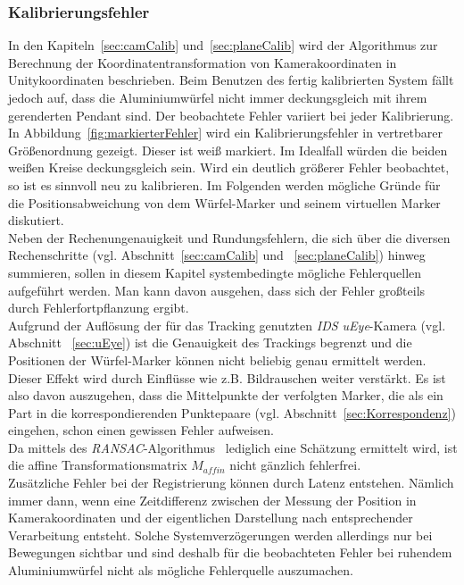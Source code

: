 \subsubsection{Kalibrierungsfehler} \label{sec:calibError}
In den Kapiteln~\ref{sec:camCalib} und~\ref{sec:planeCalib} wird der Algorithmus zur Berechnung der Koordinatentransformation von Kamerakoordinaten in Unitykoordinaten beschrieben. Beim Benutzen des fertig kalibrierten System fällt jedoch auf, dass die Aluminiumwürfel nicht immer deckungsgleich mit ihrem gerenderten Pendant sind. Der beobachtete Fehler variiert bei jeder Kalibrierung. In Abbildung~\ref{fig:markierterFehler} wird ein Kalibrierungsfehler in vertretbarer Größenordnung gezeigt. Dieser ist weiß markiert. Im Idealfall würden die beiden weißen Kreise deckungsgleich sein. Wird ein deutlich größerer Fehler beobachtet, so ist es sinnvoll neu zu kalibrieren. Im Folgenden werden mögliche Gründe für die Positionsabweichung von dem Würfel-Marker und seinem virtuellen Marker diskutiert. \\
Neben der Rechenungenauigkeit und Rundungsfehlern, die sich über die diversen Rechenschritte (vgl. Abschnitt~\ref{sec:camCalib} und ~\ref{sec:planeCalib}) hinweg summieren, sollen in diesem Kapitel systembedingte mögliche Fehlerquellen aufgeführt werden. Man kann davon ausgehen, dass sich der Fehler großteils durch Fehlerfortpflanzung \cite{schmalstieg2016augmented} ergibt.\\ 
Aufgrund der Auflösung der für das Tracking genutzten \textit{IDS uEye}-Kamera (vgl. Abschnitt ~\ref{sec:uEye}) ist die Genauigkeit des Trackings begrenzt und die Positionen der Würfel-Marker können nicht beliebig genau ermittelt werden. Dieser Effekt wird durch Einflüsse wie z.B. Bildrauschen weiter verstärkt. Es ist also davon auszugehen, dass die Mittelpunkte der verfolgten Marker, die als ein Part in die korrespondierenden Punktepaare (vgl. Abschnitt~\ref{sec:Korrespondenz}) eingehen, schon einen gewissen Fehler aufweisen. \\
Da mittels des \textit{RANSAC}-Algorithmus~\cite{articel:RANSAC} lediglich eine Schätzung ermittelt wird, ist die affine Transformationsmatrix $M_{affin}$ nicht gänzlich fehlerfrei. \\
Zusätzliche Fehler bei der Registrierung können durch Latenz entstehen. Nämlich immer dann, wenn eine Zeitdifferenz zwischen der Messung der Position in Kamerakoordinaten und der eigentlichen Darstellung nach entsprechender
Verarbeitung entsteht. Solche Systemverzögerungen werden allerdings nur bei Bewegungen sichtbar und sind deshalb für die beobachteten Fehler bei ruhendem Aluminiumwürfel nicht als mögliche Fehlerquelle auszumachen. 

